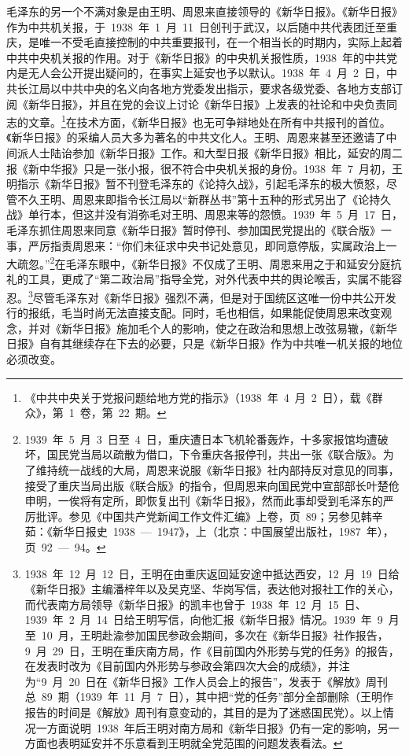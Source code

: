 毛泽东的另一个不满对象是由王明、周恩来直接领导的《新华日报》。《新华日报》作为中共机关报，于~1938~年~1~月~11~日创刊于武汉，以后随中共代表团迁至重庆，是唯一不受毛直接控制的中共重要报刊，在一个相当长的时期内，实际上起着中共中央机关报的作用。对于《新华日报》的中央机关报性质，1938~年的中共党内是无人会公开提出疑问的，在事实上延安也予以默认。1938~年~4~月~2~日，中共长江局以中共中央的名义向各地方党委发出指示，要求各级党委、各地方支部订阅《新华日报》，并且在党的会议上讨论《新华日报》上发表的社论和中央负责同志的文章。\footnote{《中共中央关于党报问题给地方党的指示》（1938~年~4~月~2~日），载《群众》，第~1~卷，第~22~期。}在技术方面，《新华日报》也无可争辩地处在所有中共报刊的首位。《新华日报》的采编人员大多为著名的中共文化人。王明、周恩来甚至还邀请了中间派人士陆诒参加《新华日报》工作。和大型日报《新华日报》相比，延安的周二报《新中华报》只是一张小报，很不符合中央机关报的身份。1938~年~7~月初，王明指示《新华日报》暂不刊登毛泽东的《论持久战》，引起毛泽东的极大愤怒，尽管不久王明、周恩来即指令长江局以“新群丛书”第十五种的形式另出了《论持久战》单行本，但这并没有消弥毛对王明、周恩来等的怨愤。1939~年~5~月~17~日，毛泽东抓住周恩来同意《新华日报》暂时停刊、参加国民党提出的《联合版》一事，严厉指责周恩来：“你们未征求中央书记处意见，即同意停版，实属政治上一大疏忽。”\footnote{1939~年~5~月~3~日至~4~日，重庆遭日本飞机轮番轰炸，十多家报馆均遭破坏，国民党当局以疏散为借口，下令重庆各报停刊，共出一张《联合版》。为了维持统一战线的大局，周恩来说服《新华日报》社内部持反对意见的同事，接受了重庆当局出版《联合版》的指令，但周恩来向国民党中宣部部长叶楚伧申明，一俟将有定所，即恢复出刊《新华日报》，然而此事却受到毛泽东的严厉批评。参见《中国共产党新闻工作文件汇编》上卷，页~89；另参见韩辛茹：《新华日报史~1938~—~1947》，上（北京：中国展望出版社，1987~年），页~92~—~94。}在毛泽东眼中，《新华日报》不仅成了王明、周恩来用之于和延安分庭抗礼的工具，更成了“第二政治局”指导全党，对外代表中共的舆论喉舌，实属不能容忍。\footnote{1938~年~12~月~12~日，王明在由重庆返回延安途中抵达西安，12~月~19~日给《新华日报》主编潘梓年以及吴克坚、华岗写信，表达他对报社工作的关心，而代表南方局领导《新华日报》的凯丰也曾于~1938~年~12~月~15~日、1939~年~2~月~14~日给王明写信，向他汇报《新华日报》情况。1939~年~9~月至~10~月，王明赴渝参加国民参政会期间，多次在《新华日报》社作报告，9~月~29~日，王明在重庆南方局，作《目前国内外形势与党的任务》的报告，在发表时改为《目前国内外形势与参政会第四次大会的成绩》，并注为“9~月~20~日在《新华日报》工作人员会上的报告”，发表于《解放》周刊总~89~期（1939~年~11~月~7~日），其中把“党的任务”部分全部删除（王明作报告的时间是《解放》周刊有意变动的，其目的是为了迷惑国民党）。以上情况一方面说明~1938~年后王明对南方局和《新华日报》仍有一定的影响，另一方面也表明延安并不乐意看到王明就全党范围的问题发表看法。}尽管毛泽东对《新华日报》强烈不满，但是对于国统区这唯一份中共公开发行的报纸，毛当时尚无法直接支配。同时，毛也相信，如果能促使周恩来改变观念，并对《新华日报》施加毛个人的影响，使之在政治和思想上改弦易辙，《新华日报》自有其继续存在下去的必要，只是《新华日报》作为中共唯一机关报的地位必须改变。

